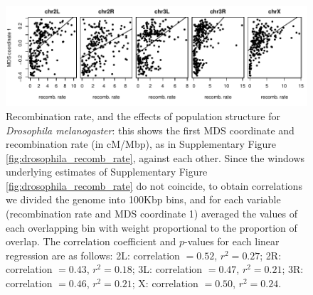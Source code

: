 \documentclass[11pt, oneside]{article}   	%
\begin{document}
\begin{figure}
    \begin{center}
        \includegraphics{drosophila_recomb_mds_correlation}
    \end{center}
    \caption{
        Recombination rate, and the effects of population structure for \textit{Drosophila melanogaster}:
        this shows the first MDS coordinate and recombination rate (in cM/Mbp), as in Supplementary Figure \ref{fig:drosophila_recomb_rate},
        against each other.
        Since the windows underlying estimates of Supplementary Figure \ref{fig:drosophila_recomb_rate} do not coincide,
        to obtain correlations we divided the genome into 100Kbp bins, 
        and for each variable (recombination rate and MDS coordinate 1)
        averaged the values of each overlapping bin with weight proportional to the proportion of overlap.
        The correlation coefficient and $p$-values for each linear regression are as follows:
        2L: correlation $=0.52$, $r^2=0.27$;
        2R: correlation $=0.43$, $r^2=0.18$;
        3L: correlation $=0.47$, $r^2=0.21$;
        3R: correlation $=0.46$, $r^2=0.21$;
        X:  correlation $=0.50$, $r^2=0.24$.
        \label{sfig:drosophila_gene_density_correlations}
    }
\end{figure}
\end{document}
